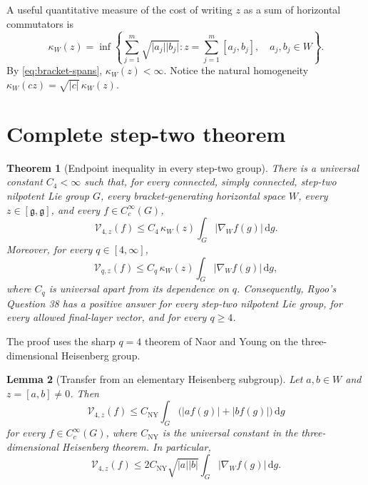 \documentclass[11pt]{article}
\newtheorem{theorem}{Theorem}
\newtheorem{lemma}[theorem]{Lemma}
\theoremstyle{remark}
\newcommand{\g}{\mathfrak g}
\newcommand{\dd}{\,\mathrm d}
\newcommand{\abs}[1]{\lvert #1\rvert}
\begin{document}
A useful quantitative measure of the cost of writing \(z\) as a sum of horizontal
commutators is
\begin{equation}\label{eq:kappa}
 \kappa_W(z)=\inf\left\{
 \sum_{j=1}^m\sqrt{\abs{a_j}\abs{b_j}}:
 z=\sum_{j=1}^m[a_j,b_j],\quad a_j,b_j\in W
 \right\}.
\end{equation}
By \eqref{eq:bracket-spans}, \(\kappa_W(z)<\infty\).  Notice the natural homogeneity
\(\kappa_W(cz)=\sqrt{\abs c}\,\kappa_W(z)\).

\section{Complete step-two theorem}

\begin{theorem}[Endpoint inequality in every step-two group]\label{thm:main}
There is a universal constant \(C_4<\infty\) such that, for every connected, simply
connected, step-two nilpotent Lie group \(G\), every bracket-generating horizontal
space \(W\), every \(z\in[\g,\g]\), and every \(f\in C_c^\infty(G)\),
\begin{equation}\label{eq:q4}
 \mathcal V_{4,z}(f)
 \le C_4\,\kappa_W(z)\int_G\abs{\nabla_W f(g)}\dd g.
\end{equation}
Moreover, for every \(q\in[4,\infty]\),
\begin{equation}\label{eq:qge4}
 \mathcal V_{q,z}(f)
 \le C_q\,\kappa_W(z)\int_G\abs{\nabla_W f(g)}\dd g,
\end{equation}
where \(C_q\) is universal apart from its dependence on \(q\).
Consequently, Ryoo's Question 38 has a positive answer for every step-two nilpotent
Lie group, for every allowed final-layer vector, and for every \(q\ge4\).
\end{theorem}

The proof uses the sharp \(q=4\) theorem of Naor and Young on the three-dimensional
Heisenberg group.

\begin{lemma}[Transfer from an elementary Heisenberg subgroup]\label{lem:H3-transfer}
Let \(a,b\in W\) and \(z=[a,b]\ne0\).  Then
\begin{equation}\label{eq:elementary-unbalanced}
 \mathcal V_{4,z}(f)
 \le C_{\mathrm{NY}}\int_G\bigl(\abs{af(g)}+\abs{bf(g)}\bigr)\dd g
\end{equation}
for every \(f\in C_c^\infty(G)\), where \(C_{\mathrm{NY}}\) is the universal constant
in the three-dimensional Heisenberg theorem.  In particular,
\begin{equation}\label{eq:elementary-balanced}
 \mathcal V_{4,z}(f)
 \le 2C_{\mathrm{NY}}\sqrt{\abs a\abs b}
 \int_G\abs{\nabla_W f(g)}\dd g.
\end{equation}
\end{lemma}
\end{document}
